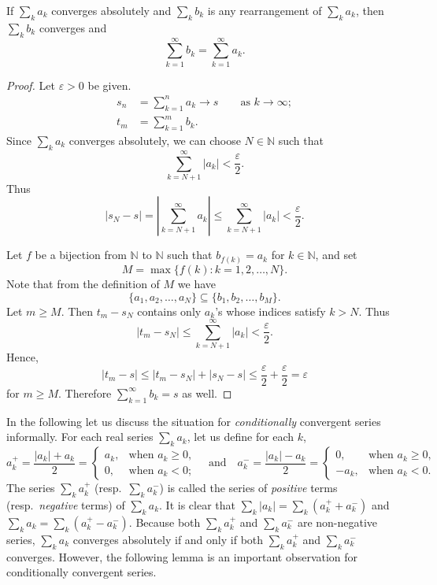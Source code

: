 \documentclass[11pt]{article}
\begin{document}
\begin{thm}
  If $\sum_k a_k$ converges absolutely and $\sum_k b_k$ is any rearrangement of $\sum_k a_k$, then $\sum_k b_k$ converges and 
  \[
    \sum_{k=1}^\infty b_k = \sum_{k=1}^\infty a_k.
  \]
\end{thm}

\begin{proof}
  Let $\varepsilon > 0$ be given.
  \begin{align*}
    s_n &= \sum_{k=1}^n a_k \to s \qquad \text{as $k \to \infty$}; \\
    t_m &= \sum_{k=1}^m b_k.
  \end{align*}
  Since $\sum_k a_k$ converges absolutely, we can choose $N \in \mathbb{N}$ such that
  \[
    \sum_{k=N+1}^\infty |a_k| < \frac{\varepsilon}{2}.
  \]
  Thus
  \[
    |s_N - s| = \left| \sum_{k=N+1}^\infty a_k \right| \leqslant \sum_{k=N+1}^\infty |a_k| < \frac{\varepsilon}{2}.
  \]

  Let $f$ be a bijection from $\mathbb{N}$ to $\mathbb{N}$ such that $b_{f(k)} = a_k$ for $k \in \mathbb{N}$, and set
  \[
    M = \max \{ f(k) \colon k = 1, 2, \dots, N \}.
  \]
  Note that from the definition of $M$ we have
  \[
    \{ a_1, a_2, \dots, a_N \} \subseteq \{ b_1, b_2, \dots, b_M \}.
  \]
  Let $m \geqslant M$.  Then $t_m - s_N$ contains only $a_k$'s whose indices satisfy $k > N$.  Thus
  \[
    |t_m - s_N| \leqslant \sum_{k=N+1}^\infty |a_k| < \frac{\varepsilon}{2}.
  \]
  Hence,
  \[
    |t_m - s| \leqslant |t_m - s_N| + |s_N - s| \leqslant \frac{\varepsilon}{2} + \frac{\varepsilon}{2} = \varepsilon
  \]
  for $m \geqslant M$.
  Therefore $\sum_{k=1}^\infty b_k = s$ as well.
\end{proof}

In the following let us discuss the situation for \textit{conditionally} convergent series informally.
For each real series $\sum_k a_k$, let us define for each $k$,
\[
  a_k^+ = \frac{|a_k|+a_k}{2} = 
  \begin{cases}
    a_k, & \text{when $a_k \geqslant 0$}, \\
    0,   & \text{when $a_k < 0$};
  \end{cases}
  \quad
  \text{and}
  \quad
  a_k^- = \frac{|a_k|-a_k}{2} = 
  \begin{cases}
    0,      & \text{when $a_k \geqslant 0$}, \\
    -a_k,   & \text{when $a_k < 0$}.
  \end{cases}
\]
The series $\sum_k a_k^+$ (resp.\ $\sum_k a_k^-$) is called the series of \textit{positive} terms (resp.\ \textit{negative} terms) of $\sum_k a_k$.
It is clear that $\sum_k |a_k| = \sum_k (a_k^+ + a_k^-)$ and $\sum_k a_k = \sum_k (a_k^+ - a_k^-)$.
Because both $\sum_k a_k^+$ and $\sum_k a_k^-$ are non-negative series, $\sum_k a_k$ converges absolutely if and only if both $\sum_k a_k^+$ and $\sum_k a_k^-$ converges.
However, the following lemma is an important observation for conditionally convergent series.
\end{document}

